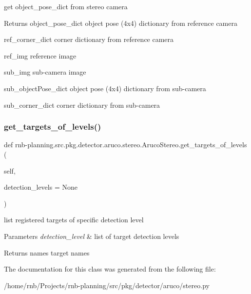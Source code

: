 get object\+\_\+pose\+\_\+dict from stereo camera 

\begin{DoxyReturn}{Returns}
object\+\_\+pose\+\_\+dict object pose (4x4) dictionary from reference camera 

ref\+\_\+corner\+\_\+dict corner dictionary from reference camera 

ref\+\_\+img reference image 

sub\+\_\+img sub-\/camera image 

sub\+\_\+object\+Pose\+\_\+dict object pose (4x4) dictionary from sub-\/camera 

sub\+\_\+corner\+\_\+dict corner dictionary from sub-\/camera 
\end{DoxyReturn}
\mbox{\label{classrnb-planning_1_1src_1_1pkg_1_1detector_1_1aruco_1_1stereo_1_1_aruco_stereo_a88d4104cd83e3d1fd82168a9bc449237}} 
\subsubsection{\texorpdfstring{get\+\_\+targets\+\_\+of\+\_\+levels()}{get\_targets\_of\_levels()}}
{\footnotesize\ttfamily def rnb-\/planning.\+src.\+pkg.\+detector.\+aruco.\+stereo.\+Aruco\+Stereo.\+get\+\_\+targets\+\_\+of\+\_\+levels (\begin{DoxyParamCaption}\item[{}]{self,  }\item[{}]{detection\+\_\+levels = {\ttfamily None} }\end{DoxyParamCaption})}



list registered targets of specific detection level 


\begin{DoxyParams}{Parameters}
{\em detection\+\_\+level} & list of target detection levels \\
\hline
\end{DoxyParams}
\begin{DoxyReturn}{Returns}
names target names 
\end{DoxyReturn}


The documentation for this class was generated from the following file\+:\begin{DoxyCompactItemize}
\item 
/home/rnb/\+Projects/rnb-\/planning/src/pkg/detector/aruco/stereo.\+py\end{DoxyCompactItemize}
